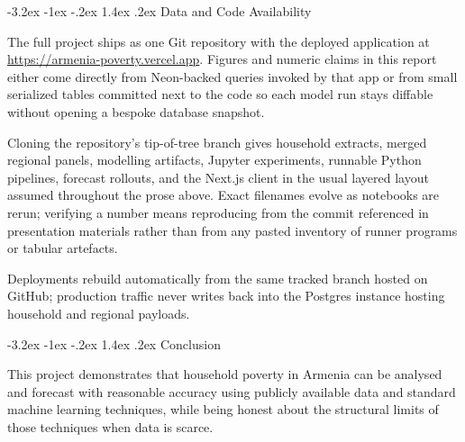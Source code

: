 \documentclass[12pt]{article}
\makeatletter
\renewcommand\section{%
  \@startsection{section}{1}{\z@}%
    {-3.2ex \@plus -1ex \@minus -.2ex}%
    {1.4ex \@plus .2ex}%
    {\color{navyblue}\large\bfseries}}
\let\oldsection\section
\renewcommand{\section}[1]{%
  \oldsection{#1}%
  \noindent{\color{rulecolor}\rule{\linewidth}{0.5pt}}\par\vspace{0.3ex}%
}
\makeatother
\begin{document}
\newpage

\section{Data and Code Availability}
\label{sec:data-code}

\indent\hspace*{1em}
The full project ships as one Git repository with the deployed application at
\url{https://armenia-poverty.vercel.app}. Figures and numeric claims in this report
either come directly from Neon-backed queries invoked by that app or from small
serialized tables committed next to the code so each model run stays diffable without
opening a bespoke database snapshot.

\vspace{0.6em}
\noindent
Cloning the repository's tip-of-tree branch gives household extracts, merged regional panels, modelling
artifacts, Jupyter experiments, runnable Python pipelines, forecast rollouts, and the
Next.js client in the usual layered layout assumed throughout the prose above. Exact
filenames evolve as notebooks are rerun; verifying a number means reproducing from the
commit referenced in presentation materials rather than from any pasted inventory of runner
programs or tabular artefacts.

\vspace{0.6em}
\noindent
Deployments rebuild automatically from the same tracked branch hosted on GitHub; production traffic never
writes back into the Postgres instance hosting household and regional payloads.

\newpage

\section{Conclusion}

\indent\hspace*{1em}
This project demonstrates that household poverty in Armenia can be analysed and
forecast with reasonable accuracy using publicly available data and standard
machine learning techniques, while being honest about the structural limits of
those techniques when data is scarce.
\end{document}
